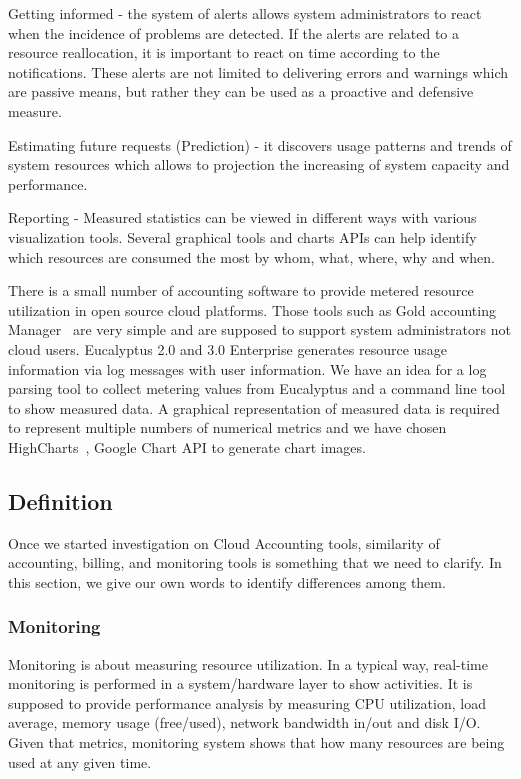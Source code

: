 \documentclass{sig-alternate}
\begin{document}
Getting informed - the system of alerts allows system administrators to react when the incidence of problems are detected. If the alerts are related to a resource reallocation, it is important to react on time according to the notifications. These alerts are not limited to delivering errors and warnings which are passive means, but rather they can be used as a proactive and defensive measure. 

Estimating future requests (Prediction) - it discovers usage patterns and trends of system resources which allows to projection the increasing of system capacity and performance. 

Reporting - Measured statistics can be viewed in different ways with various visualization tools. Several graphical tools and charts APIs can help identify which resources are consumed the most by whom, what, where, why and when. 

There is a small number of accounting software to provide metered resource utilization in open source cloud platforms. Those tools such as Gold accounting Manager~\cite{jacksongold} are very simple and are supposed to support system administrators not cloud users. Eucalyptus 2.0 and 3.0 Enterprise generates resource usage information via log messages with user information. We have an idea for a log parsing tool to collect metering values from Eucalyptus and a command line tool to show measured data. A graphical representation of measured data is required to represent multiple numbers of numerical metrics and we have chosen HighCharts~\cite{highsoft2012highcharts}, Google Chart API to generate chart images.

\subsection{Definition}

Once we started investigation on Cloud Accounting tools, similarity of accounting, billing, and monitoring tools is something that we need to clarify. In this section, we give our own words to identify differences among them. 

\subsubsection{Monitoring}

Monitoring is about measuring resource utilization. In a typical way, real-time monitoring is performed in a system/hardware layer to show activities. It is supposed to provide performance analysis by measuring CPU utilization, load average, memory usage (free/used), network bandwidth in/out and disk I/O. Given that metrics, monitoring system shows that how many resources are being used at any given time. 
\end{document}
